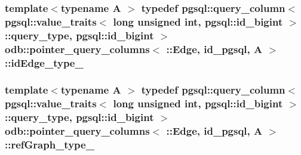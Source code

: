 \subsubsection[{id\+Edge\+\_\+type\+\_\+}]{\setlength{\rightskip}{0pt plus 5cm}template$<$typename A $>$ typedef pgsql\+::query\+\_\+column$<$ pgsql\+::value\+\_\+traits$<$ long unsigned int, pgsql\+::id\+\_\+bigint $>$\+::query\+\_\+type, pgsql\+::id\+\_\+bigint $>$ odb\+::pointer\+\_\+query\+\_\+columns$<$ \+::{\bf Edge}, id\+\_\+pgsql, A $>$\+::{\bf id\+Edge\+\_\+type\+\_\+}}\label{structodb_1_1pointer__query__columns_3_01_1_1_edge_00_01id__pgsql_00_01_a_01_4_a11b96213f73fba1aa683d630be6c0f22}
\hypertarget{structodb_1_1pointer__query__columns_3_01_1_1_edge_00_01id__pgsql_00_01_a_01_4_a5e3584b6e468f979d1c46dc559f90232}{}
\subsubsection[{ref\+Graph\+\_\+type\+\_\+}]{\setlength{\rightskip}{0pt plus 5cm}template$<$typename A $>$ typedef pgsql\+::query\+\_\+column$<$ pgsql\+::value\+\_\+traits$<$ long unsigned int, pgsql\+::id\+\_\+bigint $>$\+::query\+\_\+type, pgsql\+::id\+\_\+bigint $>$ odb\+::pointer\+\_\+query\+\_\+columns$<$ \+::{\bf Edge}, id\+\_\+pgsql, A $>$\+::{\bf ref\+Graph\+\_\+type\+\_\+}}\label{structodb_1_1pointer__query__columns_3_01_1_1_edge_00_01id__pgsql_00_01_a_01_4_a5e3584b6e468f979d1c46dc559f90232}
\hypertarget{structodb_1_1pointer__query__columns_3_01_1_1_edge_00_01id__pgsql_00_01_a_01_4_a1ffe36e7e69a82a3db331bf051b63b5b}{}
